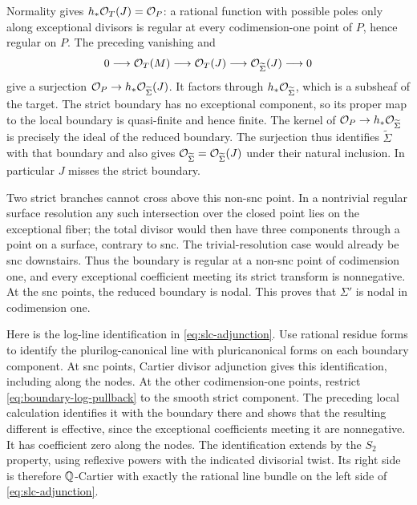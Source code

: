 Normality gives \(h_*\mathcal O_T(J)=\mathcal O_P\): a rational function with possible
poles only along exceptional divisors is regular at every codimension-one
point of \(P\), hence regular on \(P\).
The preceding vanishing and
\[
 0\longrightarrow\mathcal O_T(M)\longrightarrow\mathcal O_T(J)
 \longrightarrow\mathcal O_{\widetilde\Sigma}(J)\longrightarrow0
\]
give a surjection
\(\mathcal O_P\to h_*\mathcal O_{\widetilde\Sigma}(J)\).
It factors through \(h_*\mathcal O_{\widetilde\Sigma}\), which is a subsheaf of
the target.  The strict boundary has no exceptional component, so its
proper map to the local boundary is quasi-finite and hence finite.
The kernel of
\(\mathcal O_P\to h_*\mathcal O_{\widetilde\Sigma}\) is precisely the ideal of the
reduced boundary.  The surjection thus identifies
\(\widetilde\Sigma\) with that boundary and also gives
\(\mathcal O_{\widetilde\Sigma}=\mathcal O_{\widetilde\Sigma}(J)\)
under their natural inclusion.
In particular \(J\) misses the strict boundary.

Two strict branches cannot cross above this non-snc point.
In a nontrivial regular surface resolution any such intersection over the
closed point lies on the exceptional fiber; the total divisor would then
have three components through a point on a surface, contrary to snc.
The trivial-resolution case would already be snc downstairs.
Thus the boundary is regular at a non-snc point of codimension one,
and every exceptional coefficient meeting its strict transform is
nonnegative.  At the snc points, the reduced boundary is nodal.
This proves that \(\Sigma'\) is nodal in codimension one.

Here is the log-line identification in \eqref{eq:slc-adjunction}.
Use rational residue forms to identify the plurilog-canonical line with
pluricanonical forms on each boundary component.
At snc points, Cartier divisor adjunction gives this identification,
including along the nodes.
At the other codimension-one points, restrict
\eqref{eq:boundary-log-pullback} to the smooth strict component.
The preceding local calculation identifies it with the boundary there
and shows that the resulting different is effective, since the exceptional
coefficients meeting it are nonnegative.
It has coefficient zero along the nodes.
The identification extends by the \(S_2\) property, using reflexive powers
with the indicated divisorial twist.  Its right side is therefore
\(\mathbb Q\)-Cartier with exactly the rational line bundle on the left side
of \eqref{eq:slc-adjunction}.

